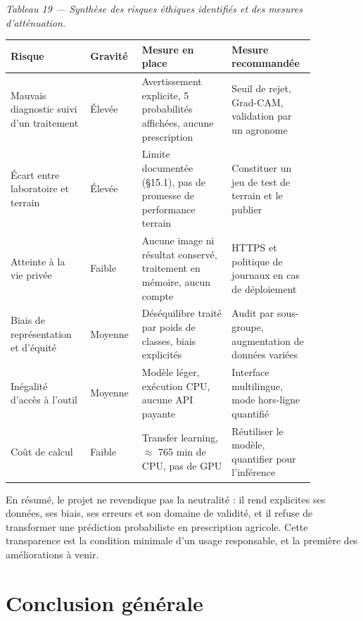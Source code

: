 \documentclass[10pt,a4paper]{article}
\begin{document}
\begin{center}\small\itshape Tableau 19 --- Synthèse des risques éthiques identifiés et des mesures d'atténuation.\end{center}
{\footnotesize
\begin{longtable}{@{}>{\raggedright\arraybackslash}p{0.24\linewidth}>{\raggedright\arraybackslash}p{0.13\linewidth}>{\raggedright\arraybackslash}p{0.27\linewidth}>{\raggedright\arraybackslash}p{0.22\linewidth}@{}}
\toprule
\textbf{Risque} & \textbf{Gravité} & \textbf{Mesure en place} & \textbf{Mesure recommandée} \\
\midrule
\endhead
\bottomrule
\endlastfoot
Mauvais diagnostic suivi d'un traitement & Élevée & Avertissement explicite, 5 probabilités affichées, aucune prescription & Seuil de rejet, Grad-CAM, validation par un agronome \\
Écart entre laboratoire et terrain & Élevée & Limite documentée (\S{}15.1), pas de promesse de performance terrain & Constituer un jeu de test de terrain et le publier \\
Atteinte à la vie privée & Faible & Aucune image ni résultat conservé, traitement en mémoire, aucun compte & HTTPS et politique de journaux en cas de déploiement \\
Biais de représentation et d'équité & Moyenne & Déséquilibre traité par poids de classes, biais explicités & Audit par sous-groupe, augmentation de données variées \\
Inégalité d'accès à l'outil & Moyenne & Modèle léger, exécution CPU, aucune API payante & Interface multilingue, mode hors-ligne quantifié \\
Coût de calcul & Faible & Transfer learning, $\approx$ 765 min de CPU, pas de GPU & Réutiliser le modèle, quantifier pour l'inférence \\
\end{longtable}
}

En résumé, le projet ne revendique pas la neutralité : il rend explicites ses données, ses biais, ses erreurs et son domaine de validité, et il refuse de transformer une prédiction probabiliste en prescription agricole. Cette transparence est la condition minimale d'un usage responsable, et la première des améliorations à venir.

\clearpage

\section{Conclusion générale}
\label{sec:8}%
\end{document}
